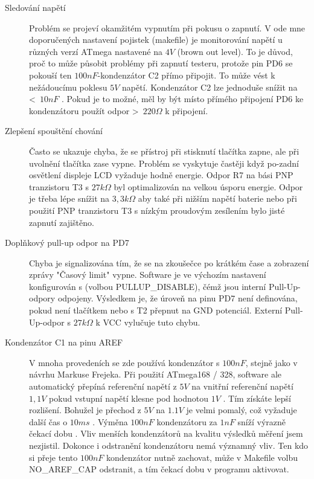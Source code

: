 \begin{description}
\item[Sledování napětí]  
Problém se projeví okamžitém vypnutím při pokusu o zapnutí.
V ode mne doporučených nastavení pojistek (makefile) je monitorování napětí u
různých verzí ATmega nastavené na \(4V\)  (brown out level).  To je důvod, proč to může působit
problémy při zapnutí testeru, protože pin PD6 se pokouší ten \(100nF\)-kondenzátor C2 
přímo připojit. To může vést k nežádoucímu poklesu \(5V\)  napětí.
Kondenzátor C2 lze jednoduše snížit na \textless~\(10nF\) . Pokud je to možné, měl by být
místo přímého připojení PD6 ke kondenzátoru použít odpor \textgreater~\(220\Omega\) k připojení.

\item[Zlepšení spouštění chování]
Často se ukazuje chyba, že se přístroj při stisknutí tlačítka zapne, ale při uvolnění tlačítka
zase vypne. Problém se vyskytuje častěji když po-zadní osvětlení displeje LCD vyžaduje hodně energie.
Odpor R7 na bási PNP tranzistoru T3 s \(27k\Omega\)  byl optimalizován na velkou úsporu energie.
Odpor je třeba lépe snížit na \(3,3k\Omega\) aby také při nižším napětí baterie nebo při použití
PNP tranzistoru T3 s nízkým proudovým zesílením bylo jisté zapnutí zajištěno.

\item[Doplňkový pull-up odpor na PD7]
Chyba je signalizována tím, že se na zkoušečce po krátkém čase a zobrazení zprávy
"Časový limit" vypne. Software je ve výchozím nastavení konfigurován s (volbou PULLUP\_DISABLE),
čémž jsou interní Pull-Up-odpory odpojeny.
Výsledkem je, že úroveň na pinu PD7 není definována, pokud není tlačítkem nebo s T2 přepnut na GND potenciál.
Externí  Pull-Up-odpor s \(27k\Omega\) k VCC vylučuje tuto chybu.

\item[Kondenzátor C1 na pinu AREF]
V mnoha provedeních se zde používá kondenzátor s \(100nF\), stejně jako v návrhu Markuse Frejeka.
Při použití ATmega168 / 328, software ale automatický přepíná referenční napětí z  \(5V\) na vnitřní
referenční napětí \(1,1V\) pokud vstupní napětí klesne pod hodnotou \(1V\) .
Tím získáte lepší rozlišení.
Bohužel je přechod z \(5V\) na \(1.1V\) je velmi pomalý, což vyžaduje další čas o \(10ms\) .
Výměna  \(100nF\) kondenzátoru za \(1nF\) sníží výrazně čekací dobu  . Vliv menších kondenzátorů
na kvalitu výsledků měření jsem nezjistil. Dokonce i odstranění kondenzátoru nemá významný vliv.
Ten kdo si přeje tento \(100nF\) kondenzátor nutně zachovat, může v Makefile volbu NO\_AREF\_CAP odstranit,
 a tím čekací dobu v programu aktivovat.


\end{description}
